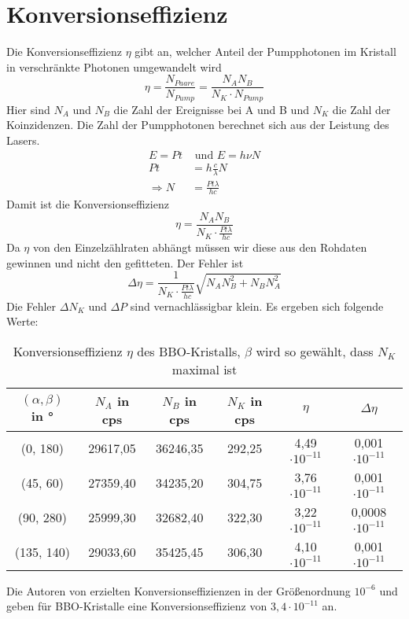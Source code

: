 \documentclass[twoside,colorback,accentcolor=tud4c,11pt]{tudreport}
\begin{document}
\section{Konversionseffizienz}
Die Konversionseffizienz $ \eta $ gibt an, welcher Anteil der Pumpphotonen im Kristall in verschränkte Photonen umgewandelt wird \cite{paper}
\begin{equation}
\eta = \frac{N_{Paare}}{N_{Pump}}=\frac{N_{A}N_{B}}{N_{K}\cdot N_{Pump}}
\end{equation}
Hier sind $ N_{A} $ und $ N_{B} $ die Zahl der Ereignisse bei A und B und $ N_{K} $ die Zahl der Koinzidenzen. Die Zahl der Pumpphotonen berechnet sich aus der Leistung des Lasers.
\begin{align*}
E=P t &\text{ und } E=h \nu N\\
P t &= h \frac{c}{\lambda} N\\
\Rightarrow N &= \frac{P t \lambda}{h c}
\end{align*}
Damit ist die Konversionseffizienz 
\begin{equation}
\eta=\frac{N_{A}N_{B}}{N_{K}\cdot \frac{P t \lambda}{h c}}
\end{equation}
Da $ \eta $ von den Einzelzählraten abhängt müssen wir diese aus den Rohdaten gewinnen und nicht den gefitteten. Der Fehler ist 
\begin{equation}
\Delta\eta=\frac{1}{N_{K}\cdot \frac{P t \lambda}{h c}}\sqrt{N_{A}N_{B}^2+N_{B}N_{A}^2}
\end{equation}
Die Fehler $ \Delta N_K $ und $ \Delta P $ sind vernachlässigbar klein. Es ergeben sich folgende Werte:
\begin{table}[H]
\renewcommand*{\arraystretch}{1.2}
\centering
\begin{tabular}{|c|c|c|c|c|c|}
\hline 
$(\alpha,\beta)$ in ° & $ N_A $ in cps & $ N_B $ in cps & $ N_K $ in cps & $ \eta $ &$ \Delta\eta $\\ 
\hline 
(0, 180) & 29617,05 &36246,35& 292,25& 4,49$\cdot10^{-11}$& 0,001$\cdot10^{-11}$ \\ 
\hline 
(45, 60) & 27359,40& 34235,20 &304,75 &3,76$\cdot10^{-11}$& 0,001$\cdot10^{-11}$ \\ 
\hline 
(90, 280) & 25999,30& 32682,40 &322,30 &3,22$\cdot10^{-11}$ & 0,0008$\cdot10^{-11}$\\ 
\hline 
(135, 140) & 29033,60 &35425,45&306,30 &4,10$\cdot10^{-11}$ & 0,001$\cdot10^{-11}$\\ 
\hline 
\end{tabular} 
\caption{Konversionseffizienz $ \eta $ des BBO-Kristalls, $ \beta $ wird so gewählt, dass $ N_K $ maximal ist}\label{effizienz}
\end{table}
Die Autoren von \cite{paper} erzielten Konversionseffizienzen in der Größenordnung $ 10^{-6} $ und geben für BBO-Kristalle eine Konversionseffizienz von $ 3,4\cdot10^{-11} $ an.
\end{document}
